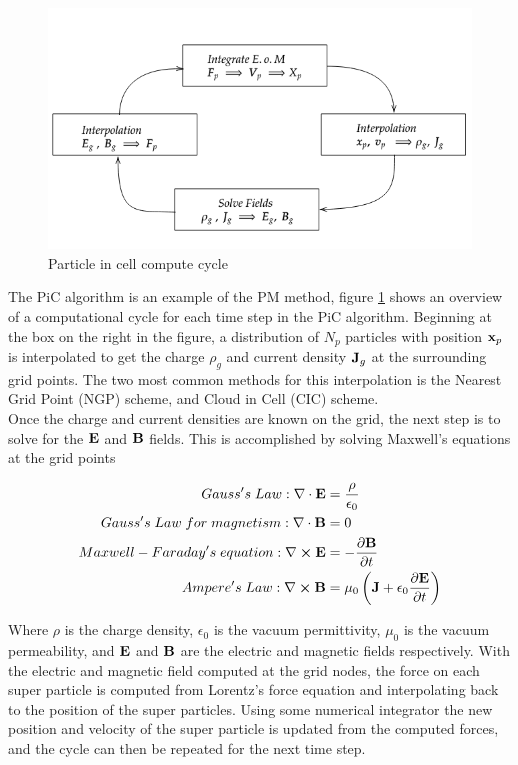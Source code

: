 \begin{figure}[h!]
    \centering
    \includegraphics[scale=0.6]{figures/PiC.png}
    \caption{Particle in cell compute cycle}
    \label{fig:pic}
\end{figure}

The PiC algorithm is an example of the PM method, figure \ref{fig:pic} shows an overview of a computational cycle for each time step in the PiC algorithm. Beginning at the box on the right in the figure, a distribution of $N_p$ particles with position $\vb{x}_p$ is interpolated to get the charge $\rho_g$ and current density $\vb{J}_g$ at the surrounding grid points. The two most common methods for this interpolation is the Nearest Grid Point (NGP) scheme, and Cloud in Cell (CIC) scheme.\\
Once the charge and current densities are known on the grid, the next step is to solve for the $\vb{E}$ and $\vb{B}$ fields. This is accomplished by solving Maxwell's equations at the grid points

\begin{subequations}
    \begin{align}
        Gauss's\; Law: \nabla \cdot \vb{E} &= \frac{\rho}{\epsilon_0} \label{eq:gauss} \\
        Gauss's\; Law\; for\; magnetism: \nabla \cdot \vb{B} &= 0 \\
        Maxwell - Faraday's\; equation: \nabla \cross \vb{E} &= - \pdv{\vb{B}}{t}\\
        Ampere's\; Law: \nabla \cross \vb{B} &= \mu_0 \left(\vb{J} + \epsilon_0 \pdv{\vb{E}}{t} \right)
    \end{align}
\end{subequations}

Where $\rho$ is the charge density, $\epsilon_0$ is the vacuum permittivity, $\mu_0$ is the vacuum permeability, and $\vb{E}$ and $\vb{B}$ are the electric and magnetic fields respectively. With the electric and magnetic field computed at the grid nodes, the force on each super particle is computed from Lorentz's force equation and interpolating back to the position of the super particles. Using some numerical integrator the new position and velocity of the super particle is updated from the computed forces, and the cycle can then be repeated for the next time step. 

